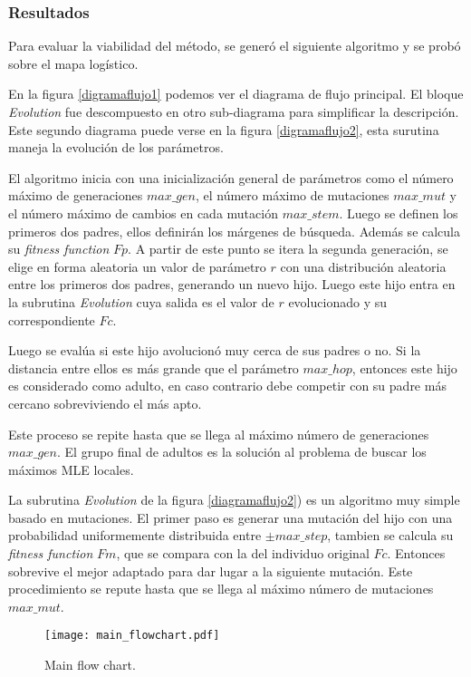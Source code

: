 \subsubsection{Resultados}

Para evaluar la viabilidad del método, se generó el siguiente algoritmo y se probó sobre el mapa logístico.

En la figura \ref{digramaflujo1} podemos ver el diagrama de flujo principal.
El bloque \textit{Evolution} fue descompuesto en otro sub-diagrama para simplificar la descripción.
Este segundo diagrama puede verse en la figura \ref{digramaflujo2}, esta surutina maneja la evolución de los parámetros.

El algoritmo inicia con una inicialización general de parámetros como el número máximo de generaciones $max\_gen$, el número máximo de mutaciones $max\_mut$ y el número máximo de cambios en cada mutación $max\_stem$.
Luego se definen los primeros dos padres, ellos definirán los márgenes de búsqueda.
Además se calcula su \textit{fitness function} $Fp$.
A partir de este punto se itera la segunda generación, se elige en forma aleatoria un valor de parámetro $r$ con una distribución aleatoria entre los primeros dos padres, generando un nuevo hijo.
Luego este hijo entra en la subrutina \textit{Evolution} cuya salida es el valor de $r$ evolucionado y su correspondiente $Fc$.

Luego se evalúa si este hijo avolucionó muy cerca de sus padres o no.
Si la distancia entre ellos es más grande que el parámetro $max\_hop$, entonces este hijo es considerado como adulto, en caso contrario debe competir con su padre más cercano sobreviviendo el más apto.

Este proceso se repite hasta que se llega al máximo número de  generaciones $max\_gen$.
El grupo final de adultos es la solución al problema de buscar los máximos MLE locales.

La subrutina \textit{Evolution} de la figura \ref{diagramaflujo2}) es un algoritmo muy simple basado en mutaciones.
El primer paso es generar una mutación del hijo con una probabilidad uniformemente distribuida entre $\pm max\_step$, tambien se calcula su \textit{fitness function} $Fm$, que se compara con la del individuo original $Fc$.
Entonces sobrevive el mejor adaptado para dar lugar a la siguiente mutación.
Este procedimiento se repute hasta que se llega al máximo número de mutaciones $max\_mut$.

\begin{figure}
	\centering
	\texttt{[image: main\_flowchart.pdf]}\\
	\caption{Main flow chart.}\label{diagramaflujo1}
\end{figure}

